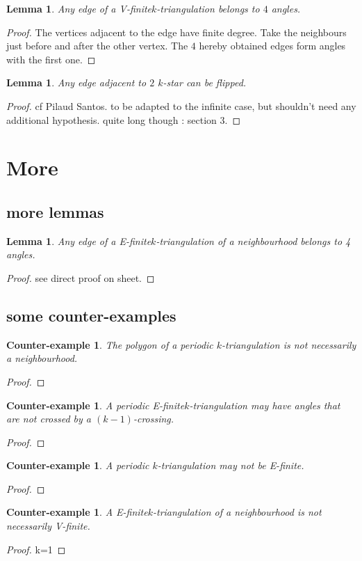 \documentclass{amsart}
\newtheorem{lemma}[theorem]{Lemma}
\newtheorem{ce}[theorem]{Counter-example}
\theoremstyle{remark}
\newcommand*{\nbd}[0]{neighbourhood\xspace}
\newcommand*{\ef}[0]{E-finite\xspace}
\newcommand*{\vf}[0]{V-finite\xspace}
\newcommand*{\ktg}[0]{$k$-triangulation\xspace}
\begin{document}
\begin{lemma}
Any edge of a \vf \ktg belongs to $4$ angles.
\end{lemma}
\begin{proof}
The vertices adjacent to the edge have finite degree. Take the neighbours just before and after the other vertex. The $4$ hereby obtained edges form angles with the first one.
\end{proof}

\begin{lemma}
Any edge adjacent to $2$ $k$-star can be flipped.
\end{lemma}
\begin{proof}
cf Pilaud Santos. to be adapted to the infinite case, but shouldn't need any additional hypothesis. quite long though : section 3.
\end{proof}

\section{More}

\subsection{more lemmas}

\begin{lemma} 
Any edge of a \ef \ktg of a \nbd belongs to 4 angles. 
\end{lemma}
\begin{proof}
see direct proof on sheet.
\end{proof}

\subsection{some counter-examples}

\begin{ce}
The polygon of a periodic \ktg is not necessarily a \nbd.
\end{ce}
\begin{proof}

\end{proof}

\begin{ce}
A periodic \ef \ktg may have angles that are not crossed by a $(k-1)$-crossing.
\end{ce}
\begin{proof}

\end{proof}

\begin{ce} 
A periodic \ktg may not be \ef.
\end{ce}
\begin{proof}

\end{proof}

\begin{ce}
A \ef \ktg of a \nbd is not necessarily \vf.
\end{ce}
\begin{proof}
k=1
\end{proof}






\end{document}

